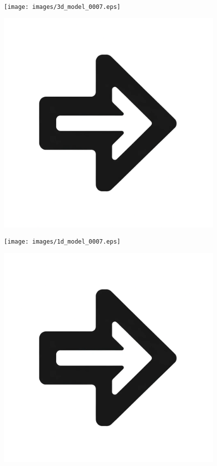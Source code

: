 \documentclass{beamer}
\begin{document}
\begin{frame}
\begin{figure}[htbp]
\begin{minipage}[c][0.35\paperheight][c]{\linewidth}
\begin{minipage}{0.1\linewidth}
			\end{minipage}
			\begin{minipage}{0.19\linewidth}
				\texttt{[image: images/3d\_model\_0007.eps]}
			\end{minipage}
			\begin{minipage}{0.1\linewidth}
				\includegraphics[width=\linewidth]{images/right_arrow.png}
			\end{minipage}
			\begin{minipage}{0.19\linewidth}
				\texttt{[image: images/1d\_model\_0007.eps]}
			\end{minipage}
			\begin{minipage}{0.1\linewidth}
				\includegraphics[width=\linewidth]{images/right_arrow.png}

\end{minipage}
\end{minipage}
\end{figure}
\end{frame}
\end{document}
